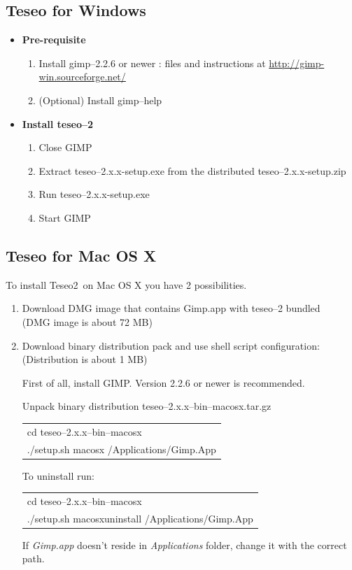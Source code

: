 \documentclass[a4paper,11pt]{article}
\newcommand{\teseo}[0]{{Teseo\small 2}}
\newcommand{\gimp}[0]{{GIMP}\index{GIMP}}
\begin{document}
\subsection{Teseo for Windows}

\begin{itemize}
\item {\bfseries Pre-requisite}
	\begin{enumerate}
	\item Install gimp--2.2.6 or newer : files and instructions at \url{http://gimp-win.sourceforge.net/} 
	\item (Optional) Install gimp--help
	\end{enumerate}

\item {\bfseries Install teseo--2}
	\begin{enumerate}
	\item Close \gimp
	\item Extract teseo--2.x.x-setup.exe from the distributed teseo--2.x.x-setup.zip
	\item Run teseo--2.x.x-setup.exe
	\item Start \gimp
	\end{enumerate}
\end{itemize}



\subsection{Teseo for Mac OS X}

To install \teseo\ on Mac OS X you have 2 possibilities.

\begin{enumerate}
\item Download DMG image that contains Gimp.app with teseo--2 bundled \\
        (DMG image is about 72 MB)

\item Download binary distribution pack and use shell script configuration: \\
        (Distribution is about 1 MB)

	First of all, install \gimp. Version 2.2.6 or newer is recommended.

        Unpack binary distribution teseo--2.x.x--bin--macosx.tar.gz

{\itshape
\begin{tabular}{l}
cd teseo--2.x.x--bin--macosx \\
./setup.sh macosx /Applications/Gimp.App
\end{tabular}
}

        To uninstall run:

{\itshape
\begin{tabular}{l}
cd teseo--2.x.x--bin--macosx \\
./setup.sh macosxuninstall /Applications/Gimp.App
\end{tabular}
}

If {\itshape Gimp.app} doesn't reside in {\itshape Applications} folder, change it with the correct path.

\end{enumerate}
\end{document}
